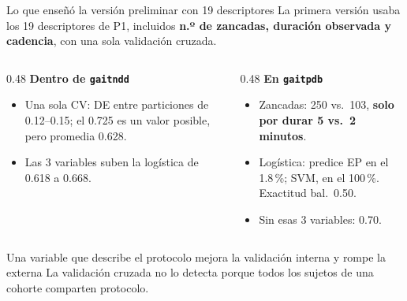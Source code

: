\documentclass[aspectratio=169,10pt]{beamer}
\begin{document}
\begin{frame}{Lo que enseñó la versión preliminar con 19 descriptores}
  La primera versión usaba los 19 descriptores de P1, incluidos \textbf{n.º de zancadas, duración observada y cadencia}, con una sola validación cruzada.

  \vspace{0.8em}
  \begin{columns}[T]
    \begin{column}{0.48\textwidth}
      \textbf{Dentro de \texttt{gaitndd}}
      \begin{itemize}
        \item Una sola CV: DE entre particiones de 0.12--0.15; el 0.725 es un valor posible, pero promedia 0.628.
        \item Las 3 variables suben la logística de 0.618 a 0.668.
      \end{itemize}
    \end{column}
    \begin{column}{0.48\textwidth}
      \textbf{En \texttt{gaitpdb}}
      \begin{itemize}
        \item Zancadas: 250 vs.\ 103, \textbf{solo por durar 5 vs.\ 2 minutos}.
        \item Logística: predice EP en el 1.8\,\%; SVM, en el 100\,\%. Exactitud bal.\ 0.50.
        \item Sin esas 3 variables: 0.70.
      \end{itemize}
    \end{column}
  \end{columns}

  \vspace{1em}
  \begin{alertblock}{Una variable que describe el protocolo mejora la validación interna y rompe la externa}
    La validación cruzada no lo detecta porque todos los sujetos de una cohorte comparten protocolo.
  \end{alertblock}
\end{frame}
\end{document}
